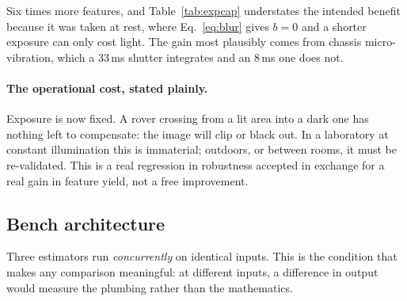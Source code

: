 Six times more features, and Table~\ref{tab:expcap} understates the intended
benefit because it was taken at rest, where Eq.~\eqref{eq:blur} gives $b=0$
and a shorter exposure can only cost light. The gain most plausibly comes from
chassis micro-vibration, which a $33$\,ms shutter integrates and an $8$\,ms one
does not.

\paragraph{The operational cost, stated plainly.} Exposure is now fixed. A
rover crossing from a lit area into a dark one has nothing left to compensate:
the image will clip or black out. In a laboratory at constant illumination
this is immaterial; outdoors, or between rooms, it must be re-validated. This
is a real regression in robustness accepted in exchange for a real gain in
feature yield, not a free improvement.

\subsection{Bench architecture}
\label{ssec:archi}

Three estimators run \emph{concurrently} on identical inputs. This is the
condition that makes any comparison meaningful: at different inputs, a
difference in output would measure the plumbing rather than the mathematics.

